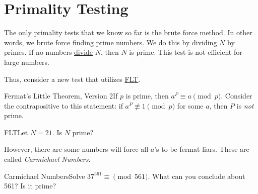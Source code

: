 \section{Primality Testing}

The only primality tests that we know so far is the brute force method. In other words, we brute force finding prime numbers. We do this by dividing \(N\) by primes. If no numbers \hyperlink{Divides}{divide} \(N\), then \(N\) is prime. This test is not efficient for large numbers.

Thus, consider a new test that utilizes \hyperlink{thm:Fermat's Little Theorem}{FLT}.

\begin{theorem}
    {Fermat's Little Theorem, Version 2}If \(p\) is prime, then \(a^P \equiv a \pmod{p}\). Consider the contrapositive to this statement: if \(a^P \not\equiv 1 \pmod{p}\) for some \(a\), then \(P\) is \textit{not} prime.
\end{theorem}

\begin{example}
    {FLT}Let \(N = 21\). Is \(N\) prime?
\end{example}




However, there are some numbers will force all \(a\)'s to be fermat liars. These are called \textit{Carmichael Numbers}.

\newpage
\begin{example}
    {Carmichael Numbers}Solve \(37^{561} \equiv \pmod{561}\). What can you conclude about 561? Is it prime?
\end{example}

\hypertarget{sec:Miller-Rabin}{}
